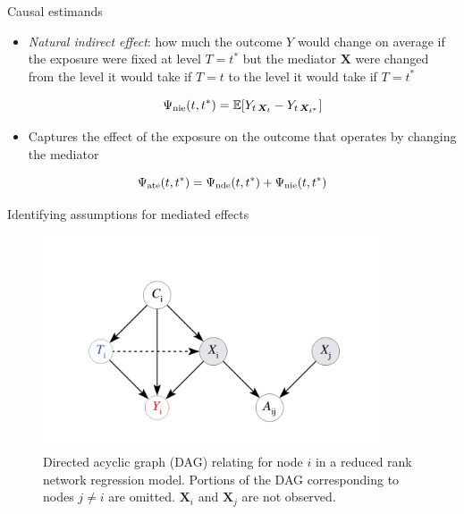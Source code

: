 \documentclass{beamer}
\theoremstyle{remark}
\newcommand{\X}{\bm X}
\newcommand{\ate}{\Psi_\text{ate} \paren*{t, t^*}}
\newcommand{\nde}{\Psi_\text{nde} \paren*{t, t^*}}
\newcommand{\nie}{\Psi_\text{nie} \paren*{t, t^*}}
\DeclarePairedDelimiter{\paren}{(}{)}
\DeclarePairedDelimiter{\brac}{[}{]}
\newcommand{\E}[2][]{%
   \ifthenelse{ \equal{#1}{} }
      {\ensuremath{\mathbb{E} \brac*{#2}}}
      {\ensuremath{\mathbb{E} \brac*{#2 \mid #1}}}
}
\begin{document}
\begin{frame}{Causal estimands}

    \begin{itemize}
        \item \emph{Natural indirect effect}: how much the outcome $Y$ would change on average if the exposure were fixed at level $T = t^*$ but the mediator $\X$ were changed from the level it would take if $T=t$ to the level it would take if $T = t^*$

              \begin{equation*}
                  \nie = \E{Y_{t \, \X_{t}} - Y_{t \, \X_{t^*}}}
              \end{equation*}

        \item Captures the effect of the exposure on the outcome that operates by changing the mediator
    \end{itemize}

    \begin{equation*}
        \ate = \nde + \nie
    \end{equation*}

\end{frame}

\begin{frame}{Identifying assumptions for mediated effects}

    \centering

    \begin{figure}
        \includegraphics[width=0.9\textwidth]{figures/mediating.png}
        \caption{Directed acyclic graph (DAG) relating for node $i$ in a reduced rank network regression model. Portions of the DAG corresponding to nodes $j \neq i$ are omitted. $\X_i$ and $\X_j$ are not observed.}
        \label{fig:mediating}
    \end{figure}

\end{frame}
\end{document}
